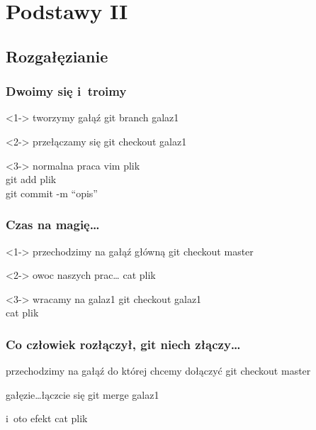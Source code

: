 \documentclass[10pt]{beamer}
\begin{document}
\section{Podstawy II}
\subsection{Rozgałęzianie}
\begin{frame}
	\frametitle{Dwoimy się i~troimy}	
	\begin{block}<1->
	{tworzymy gałąź}
	git branch galaz1
	\end{block}
	\begin{block}<2->
	{przełączamy się}
	git checkout galaz1
	\end{block}
	\begin{block}<3->
	{normalna praca}
	vim plik\\
	git add plik\\
	git commit -m ``opis''
	\end{block}
\end{frame}
\begin{frame}
	\frametitle{Czas na magię\ldots}
	\begin{block}<1->
	{przechodzimy na gałąź główną}
	git checkout master
	\end{block}
	\begin{block}<2->
	{owoc naszych prac\ldots}
	cat plik
	\end{block}
	\begin{block}<3->
	{wracamy na galaz1}
	git checkout galaz1\\
	cat plik
	\end{block}
\end{frame}
\begin{frame}
	\frametitle{Co człowiek rozłączył, git niech złączy\ldots}
	\begin{block}
	{przechodzimy na gałąź do której chcemy dołączyć}
	git checkout master
	\end{block}
	\begin{block}
	{gałęzie\ldots łączcie się}
	git merge galaz1
	\end{block}
	\begin{block}
	{i~oto efekt}
	cat plik
	\end{block}
\end{frame}
\end{document}
